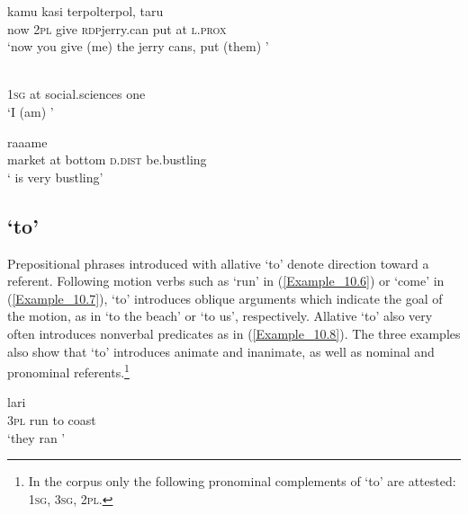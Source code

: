 \ea
\label{Example_10.3}
 {kamu} {kasi} {terpol{\Tilde}terpol,} {taru} {} {}\\ %
 now  \textsc{2pl}  give  \textsc{rdp}{\Tilde}jerry.can  put  at  \textsc{l.prox}\\
\glt 
‘now you give (me) the jerry cans, put (them) ’ \textstyleExampleSource{[081110-002-Cv.0065]}
\z

\ea
\label{Example_10.4}
 {} {} {}\\ %
 \textsc{1sg}  at  social.sciences  one\\
 ‘I (am) ’ \textstyleExampleSource{[081023-004-Cv.0020]}
\z

\ea
\label{Example_10.5}
 {} {} {} {raaame}\\ %
 market  at  bottom  \textsc{d.dist}  be.bustling\\
\glt
‘ is very bustling’ \textstyleExampleSource{[081109-005-JR.0008]}
\z

\subsection{ ‘to’}
\label{Para_10.1.2}
Prepositional phrases introduced with allative  ‘to’ denote direction toward a referent. Following motion verbs such as  ‘run’ in (\ref{Example_10.6}) or  ‘come’ in (\ref{Example_10.7}),  ‘to’ introduces oblique  arguments which indicate the goal of the motion, as in  ‘to the beach’ or  ‘to us’, respectively. Allative  ‘to’ also very often introduces nonverbal predicates as in (\ref{Example_10.8}). The three examples also show that  ‘to’ introduces animate and inanimate, as well as nominal and pronominal referents.\footnote{In the corpus only the following pronominal complements of  ‘to’ are attested: \textsc{1sg}, \textsc{3sg}, \textsc{2pl}.}


\ea
\label{Example_10.6}
 {lari} {} {}\\ %
 \textsc{3pl}  run  to  coast\\
\glt 
‘they ran ’ \textstyleExampleSource{[081115-001a-Cv.0008]}
\z

